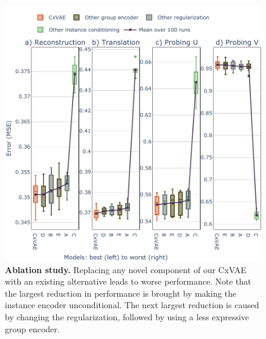 \documentclass[nohyperref]{article}
\theoremstyle{plain}
\theoremstyle{definition}
\theoremstyle{remark}
\begin{document}
\begin{figure}[t]
\vskip 0.2in
\begin{center}
\centerline{\includegraphics[width=\columnwidth]{files/ablation.pdf}}
\caption{\textbf{Ablation study.} Replacing any novel component of our CxVAE with an existing alternative leads to worse performance. Note that the largest reduction in performance is brought by making the instance encoder unconditional. The next largest reduction is caused by changing the regularization, followed by using a less expressive group encoder.}
\label{fig:ablation}
\end{center}
\vskip -0.2in
\end{figure}
\end{document}
